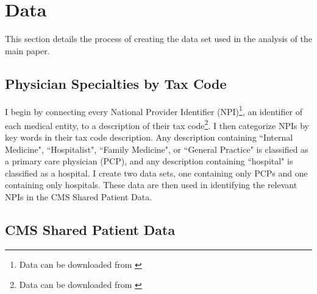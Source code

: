\documentclass[12pt]{article}
\begin{document}
 




\clearpage
\onehalfspacing

\printbibliography

\clearpage


\appendix

\section{Data}\label{app:data}

This section details the process of creating the data set used in the analysis of the main paper. 

\subsection{Physician Specialties by Tax Code}\label{sec:taxcode}

I begin by connecting every National Provider Identifier (NPI)\footnote{Data can be downloaded from \hyperlink{https://download.cms.gov/nppes/NPI/Files.html}{}}, an identifier of each medical entity, to a description of their tax code\footnote{Data can be downloaded from \hyperlink{https://nucc.org/index.php/code-sets-mainmenu-41/provider-taxonomy-mainmenu-40/pdf-mainmenu-53}{}}. I then categorize NPIs by key words in their tax code description. Any description containing ``Internal Medicine", ``Hospitalist", ``Family Medicine", or ``General Practice" is classified as a primary care physician (PCP), and any description containing ``hospital" is classified as a hospital. I create two data sets, one containing only PCPs and one containing only hospitals. These data are then used in identifying the relevant NPIs in the CMS Shared Patient Data. 



\subsection{CMS Shared Patient Data}\label{sec:sharedpat}
\end{document}
